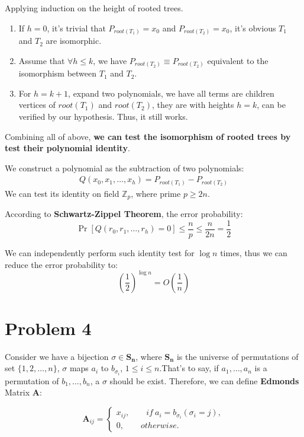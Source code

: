 \documentclass[a4paper, 12pt, titlepage]{article}
\begin{document}
Applying induction on the height of rooted trees.
\begin{enumerate}[1]
    \item If $h = 0$, it's trivial that $P_{root(T_{1})} = x_{0}$ and $P_{root(T_{2})} = x_{0}$, it's obvious $T_{1}$ and $T_{2}$ are isomorphic.
    \item Assume that $\forall h \leq k$, we have $P_{root(T_{2})} \equiv P_{root(T_{2})}$ equivalent to the isomorphism between $T_{1}$ and $T_{2}$.
    \item For $h = k + 1$, expand two polynomials, we have all terms are children vertices of $root(T_{1})$ and $root(T_{2})$, they are with heights $h = k$, can be verified by our hypothesis.
          Thus, it still works.
\end{enumerate}
Combining all of above, \textbf{we can test the isomorphism of rooted trees by test their polynomial identity}. 

We construct a polynomial as the subtraction of two polynomials:
\begin{equation}
    \begin{aligned}
        Q \left(x_{0}, x_{1}, \ldots, x_{h} \right) = P_{root(T_{1})} - P_{root(T_{2})}
    \end{aligned}
\end{equation}
We can test its identity on field $\mathbb{Z}_{p}$, where prime $p \geq 2n$.

According to \textbf{Schwartz-Zippel Theorem}, the error probability:
\[
    \Pr \left[ Q(r_{0}, r_{1}, \ldots, r_{h}) = 0 \right] \leq \frac{n}{p} \leq \frac{n}{2n} = \frac{1}{2}
\]        

We can independently perform such identity test for $\log{n}$ times, thus we can reduce the error probability to:
\[
    \left( \frac{1}{2} \right)^{\log{n}} = O \left( \frac{1}{n} \right)
\]

\section{Problem 4}
Consider we have a bijection $\sigma \in \mathbf{S_{n}}$, where $\mathbf{S_{n}}$ is the universe of permutations of set $\{1,2, \ldots, n\}$,
$\sigma$ maps $a_{i}$ to $b_{\sigma_{i}}$, $1 \leq i \leq n$.That's to say, if $a_{1}, \ldots, a_{n}$ is a permutation of 
$b_{1}, \ldots, b_{n}$, a $\sigma$ should be exist.
Therefore, we can define \textbf{Edmonds} Matrix \textbf{A}:

\[
    \mathbf{A}_{ij} = \begin{cases}
                x_{ij}, \qquad if\ a_{i} = b_{\sigma_{i}} \left( \sigma_{i} = j \right),\\
                0, \qquad otherwise.
             \end{cases}
\]
\end{document}
